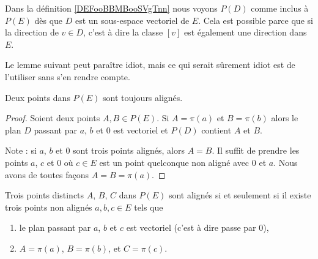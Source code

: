 \begin{normaltext}
    Dans la définition \ref{DEFooBBMBooSVgTnn} nous voyons \( P(D)\) comme inclus à \( P(E)\) dès que \( D\) est un sous-espace vectoriel de \( E\). Cela est possible parce que si la direction de \( v\in D\), c'est à dire la classe \( [v]\) est également une direction dans \( E\).
\end{normaltext}

Le lemme suivant peut paraître idiot, mais ce qui serait sûrement idiot est de l'utiliser sans s'en rendre compte.

\begin{lemma}
    Deux points dans \( P(E)\) sont toujours alignés.
\end{lemma}

\begin{proof}
    Soient deux points \( A,B\in P(E)\). Si \( A=\pi(a)\) et \( B=\pi(b)\) alors le plan \( D\) passant par \( a\), \( b\) et \( 0\) est vectoriel et \( P(D)\) contient \( A\) et \( B\).

    Note : si \( a\), \( b\) et \( 0\) sont trois points alignés, alors \( A=B\). Il suffit de prendre les points \( a\), \( c\) et \( 0\) où \( c\in E\) est un point quelconque non aligné avec \( 0\) et \( a\). Nous avons de toutes façons \( A=B=\pi(a)\).
\end{proof}

\begin{lemma}
    Trois points distincts \( A\), \( B\), \( C\) dans \( P(E)\) sont alignés si et seulement si il existe trois points non alignés \( a,b,c\in E\) tels que
    \begin{enumerate}
        \item
            le plan passant par \( a\), \( b\) et \( c\) est vectoriel (c'est à dire passe par \( 0\)),
        \item 
            \( A=\pi(a)\), \( B=\pi(b)\), et \( C=\pi(c)\).
    \end{enumerate}
\end{lemma}

